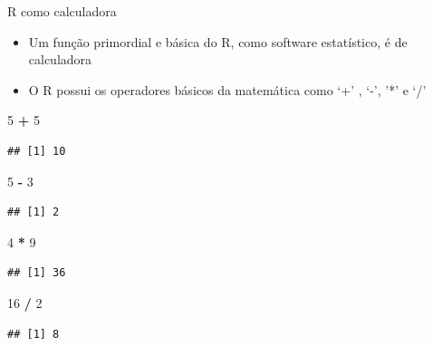 \documentclass[
  10pt,
  ignorenonframetext,
]{beamer}
\newenvironment{Shaded}{\begin{snugshade}}{\end{snugshade}}
\newcommand{\DecValTok}[1]{\textcolor[rgb]{0.00,0.00,0.81}{#1}}
\newcommand{\OperatorTok}[1]{\textcolor[rgb]{0.81,0.36,0.00}{\textbf{#1}}}
\newcommand{\StringTok}[1]{\textcolor[rgb]{0.31,0.60,0.02}{#1}}
\providecommand{\tightlist}{%
  \setlength{\itemsep}{0pt}\setlength{\parskip}{0pt}}
\begin{document}
\begin{frame}[fragile]{R como calculadora}
\protect\hypertarget{r-como-calculadora}{}
\begin{itemize}
\tightlist
\item
  Um função primordial e básica do R, como software estatístico, é de
  calculadora
\item
  O R possui os operadores básicos da matemática como `+' , `-', '*' e
  `/'
\end{itemize}

\begin{Shaded}
\begin{Highlighting}[]
\DecValTok{5} \OperatorTok{+}\StringTok{ }\DecValTok{5}
\end{Highlighting}
\end{Shaded}

\begin{verbatim}
## [1] 10
\end{verbatim}

\begin{Shaded}
\begin{Highlighting}[]
\DecValTok{5} \OperatorTok{{-}}\StringTok{ }\DecValTok{3}
\end{Highlighting}
\end{Shaded}

\begin{verbatim}
## [1] 2
\end{verbatim}

\begin{Shaded}
\begin{Highlighting}[]
\DecValTok{4} \OperatorTok{*}\StringTok{ }\DecValTok{9}
\end{Highlighting}
\end{Shaded}

\begin{verbatim}
## [1] 36
\end{verbatim}

\begin{Shaded}
\begin{Highlighting}[]
\DecValTok{16} \OperatorTok{/}\StringTok{ }\DecValTok{2}
\end{Highlighting}
\end{Shaded}

\begin{verbatim}
## [1] 8
\end{verbatim}
\end{frame}
\end{document}
